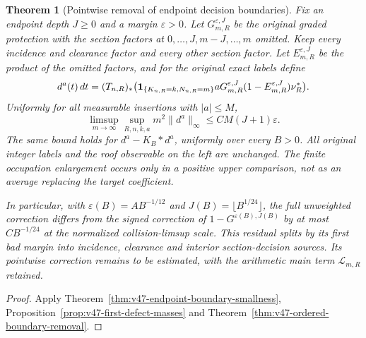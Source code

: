 \documentclass[11pt,reqno]{amsart}
\numberwithin{equation}{section}
\newtheorem{leadtheorem}{Theorem}
\theoremstyle{definition}\newtheorem{definition}[theorem]{Definition}
\theoremstyle{remark}\newtheorem{remark}[theorem]{Remark}
\begin{document}
\begin{leadtheorem}[Pointwise removal of endpoint decision boundaries]
\label{thm:intro-v47-boundary-decisions}
Fix an endpoint depth $J\ge0$ and a margin $\varepsilon>0$. Let
$G^{\varepsilon,J}_{m,R}$ be the original graded protection with the
section factors at $0,\ldots,J,m-J,\ldots,m$ omitted. Keep every
incidence and clearance factor and every other section factor. Let
$E^{\varepsilon,J}_{m,R}$ be the product of the omitted factors, and
for the original exact labels define
\[
 d^a(t)\,dt=(T_{n,R})_*
 \bigl(\mathbf1_{\{K_{n,R}=k,N_{n,R}=m\}}
       aG^{\varepsilon,J}_{m,R}(1-E^{\varepsilon,J}_{m,R})\nu_R^*\bigr).
\]
Uniformly for all measurable insertions with $|a|\le M$,
\[
 \limsup_{m\to\infty}\sup_{R,n,k,a}m^2\|d^a\|_\infty
       \le CM(J+1)\varepsilon.
\]
The same bound holds for $d^a-K_B*d^a$, uniformly over every $B>0$.
All original integer labels and the roof observable on the left are
unchanged. The finite occupation enlargement occurs only in a positive
upper comparison, not as an average replacing the target coefficient.

In particular, with $\varepsilon(B)=AB^{-1/12}$ and
$J(B)=\lfloor B^{1/24}\rfloor$, the full unweighted correction differs
from the signed correction of $1-G^{\varepsilon(B),J(B)}$ by at most
$CB^{-1/24}$ at the normalized collision-limsup scale. This residual
splits by its first bad margin into incidence, clearance and interior
section-decision sources. Its pointwise correction remains to be
estimated, with the arithmetic main term $\mathcal L_{m,R}$ retained.
\end{leadtheorem}
\begin{proof}
Apply Theorem~\ref{thm:v47-endpoint-boundary-smallness},
Proposition~\ref{prop:v47-first-defect-masses} and
Theorem~\ref{thm:v47-ordered-boundary-removal}.
\end{proof}
\end{document}
